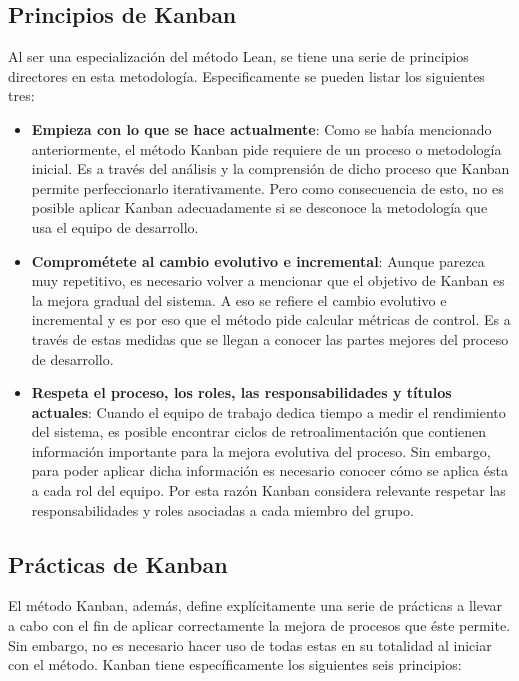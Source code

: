 \subsection{Principios de Kanban}
Al ser una especialización del método Lean, se tiene una serie de principios
directores en esta metodología. Especificamente se pueden listar los siguientes
tres:
\begin{itemize}
    \item \textbf{Empieza con lo que se hace actualmente}: %
    Como se había mencionado anteriormente, el método Kanban pide requiere de un
    proceso o metodología inicial. Es a través del análisis y la comprensión de
    dicho proceso que Kanban permite perfeccionarlo iterativamente. Pero como
    consecuencia de esto, no es posible aplicar Kanban adecuadamente si se
    desconoce la metodología que usa el equipo de desarrollo.

    \item \textbf{Comprométete al cambio evolutivo e incremental}: %
    Aunque parezca muy repetitivo, es necesario volver a mencionar que el
    objetivo de Kanban es la mejora gradual del sistema. A eso se refiere el
    cambio evolutivo e incremental y es por eso que el método pide calcular
    métricas de control. Es a través de estas medidas que se llegan a conocer
    las partes mejores del proceso de desarrollo.

    \item \textbf{Respeta el proceso, los roles, las responsabilidades y títulos
    actuales}: %
    Cuando el equipo de trabajo dedica tiempo a medir el rendimiento del
    sistema, es posible encontrar ciclos de retroalimentación que contienen
    información importante para la mejora evolutiva del proceso. Sin embargo,
    para poder aplicar dicha información es necesario conocer cómo se aplica
    ésta a cada rol del equipo. Por esta razón Kanban considera relevante
    respetar las responsabilidades y roles asociadas a cada miembro del grupo.
\end{itemize}

\subsection{Prácticas de Kanban}

El método Kanban, además, define explícitamente una serie de prácticas a llevar
a cabo con el fin de aplicar correctamente la mejora de procesos que éste
permite. Sin embargo, no es necesario hacer uso de todas estas en su totalidad
al iniciar con el método. Kanban tiene específicamente los siguientes seis principios:

